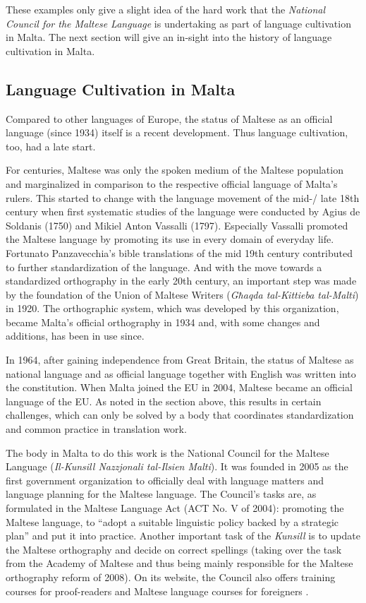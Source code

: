 \documentclass[]{../../metanetpaper}
\begin{document}
\begin{multicols}{2}
These examples only give a slight idea of the hard work that the \emph{National Council for the Maltese Language} is undertaking as part of language cultivation in Malta. The next section will give an in-sight into the history of language cultivation in Malta.

\subsection{Language Cultivation in Malta}

Compared to other languages of Europe, the status of Maltese as an official language (since 1934) itself is a recent development. Thus language cultivation, too, had a late start. 

For centuries, Maltese was only the spoken medium of the Maltese population and marginalized in comparison to the respective official language of Malta's rulers. This started to change with the language movement of the mid-/ late 18th century when first systematic studies of the language were conducted by Agius de Soldanis (1750) and Mikiel Anton Vassalli (1797). Especially Vassalli promoted the Maltese language by promoting its use in every domain of everyday life. Fortunato Panzavecchia's bible translations of the mid 19th century contributed to further standardization of the language. And with the move towards a standardized orthography in the early 20th century, an important step was made by the foundation of the Union of Maltese Writers (\emph{Għaqda tal-Kittieba tal-Malti}) in 1920. The orthographic system, which was developed by this organization, became Malta's official orthography in 1934 and, with some changes and additions, has been in use since.

In 1964, after gaining independence from Great Britain, the status of Maltese as national language and as official language together with English was written into the constitution. When Malta joined the EU in 2004, Maltese became an official language of the EU. As noted in the section above, this results in certain challenges, which can only be solved by a body that coordinates standardization and common practice in translation work.

The body in Malta to do this work is the National Council for the Maltese Language (\emph{Il-Kunsill Nazzjonali tal-Ilsien Malti}). It was founded in 2005 as the first government organization to officially deal with language matters and language planning for the Maltese language. The Council's tasks are, as formulated in the Maltese Language Act (ACT No. V of 2004): promoting the Maltese language, to ``adopt a suitable linguistic policy backed by a strategic plan'' and put it into practice. Another important task of the \emph{Kunsill} is to update the Maltese orthography and decide on correct spellings (taking over the task from the Academy of Maltese and thus being mainly responsible for the Maltese orthography reform of 2008). On its website, the Council also offers training courses for proof-readers and Maltese language courses for foreigners \cite{Kunsill1}. 


\end{multicols}
\end{document}
